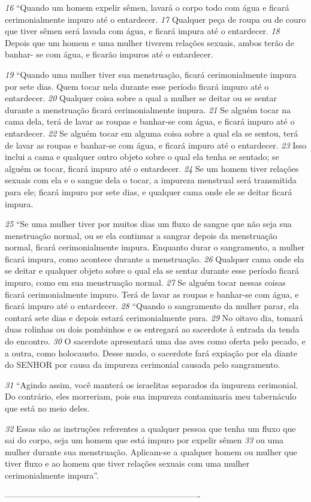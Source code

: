 \bigskip
\textit{\tiny 16}
“Quando um homem expelir sêmen, lavará o corpo todo com água e ficará
cerimonialmente impuro até o entardecer. 
\textit{\tiny 17}
Qualquer peça de roupa ou de couro
que tiver sêmen será lavada com água, e ficará impura até o entardecer. 
\textit{\tiny 18}
Depois
que um homem e uma mulher tiverem relações sexuais, ambos terão de banhar-
se com água, e ficarão impuros até o entardecer.
   
\bigskip
\textit{\tiny 19}
“Quando uma mulher tiver sua menstruação, ficará cerimonialmente impura
por sete dias. Quem tocar nela durante esse período ficará impuro até o
entardecer. 
\textit{\tiny 20}
Qualquer coisa sobre a qual a mulher se deitar ou se sentar durante
a menstruação ficará cerimonialmente impura. 
\textit{\tiny 21}
Se alguém tocar na cama dela,
terá de lavar as roupas e banhar-se com água, e ficará impuro até o entardecer.
\textit{\tiny 22}
Se alguém tocar em alguma coisa sobre a qual ela se sentou, terá de lavar as
roupas e banhar-se com água, e ficará impuro até o entardecer. 
\textit{\tiny 23}
Isso inclui a
cama e qualquer outro objeto sobre o qual ela tenha se sentado; se alguém os
tocar, ficará impuro até o entardecer. 
\textit{\tiny 24}
Se um homem tiver relações sexuais com
ela e o sangue dela o tocar, a impureza menstrual será transmitida para ele; ficará
impuro por sete dias, e qualquer cama onde ele se deitar ficará impura.
   
\bigskip
\textit{\tiny 25}
“Se uma mulher tiver por muitos dias um fluxo de sangue que não seja sua
menstruação normal, ou se ela continuar a sangrar depois da menstruação
normal, ficará cerimonialmente impura. Enquanto durar o sangramento, a mulher
ficará impura, como acontece durante a menstruação. 
\textit{\tiny 26}
Qualquer cama onde ela
se deitar e qualquer objeto sobre o qual ela se sentar durante esse período ficará
impuro, como em sua menstruação normal. 
\textit{\tiny 27}
Se alguém tocar nessas coisas
ficará cerimonialmente impuro. Terá de lavar as roupas e banhar-se com água, e
ficará impuro até o entardecer.
\textit{\tiny 28}
“Quando o sangramento da mulher parar, ela contará sete dias e depois
estará cerimonialmente pura. 
\textit{\tiny 29}
No oitavo dia, tomará duas rolinhas ou dois
pombinhos e os entregará ao sacerdote à entrada da tenda do encontro. 
\textit{\tiny 30}
O
sacerdote apresentará uma das aves como oferta pelo pecado, e a outra, como
holocausto. Desse modo, o sacerdote fará expiação por ela diante do SENHOR por
causa da impureza cerimonial causada pelo sangramento.

\smallskip
\textit{\tiny 31}
“Agindo assim, você manterá os israelitas separados da impureza cerimonial.
Do contrário, eles morreriam, pois sua impureza contaminaria meu tabernáculo
que está no meio deles. 

\smallskip
\textit{\tiny 32}
Essas são as instruções referentes a qualquer pessoa
que tenha um fluxo que sai do corpo, seja um homem que está impuro por expelir
sêmen 
\textit{\tiny 33}
ou uma mulher durante sua menstruação. Aplicam-se a qualquer
homem ou mulher que tiver fluxo e ao homem que tiver relações sexuais com
uma mulher cerimonialmente impura”.

----------------------------------------------------------------------
